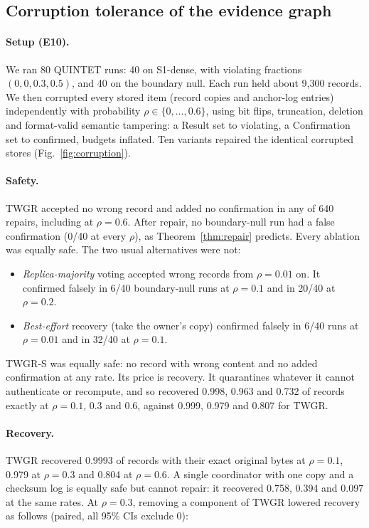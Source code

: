 \documentclass[11pt]{article}
\theoremstyle{definition}
\begin{document}
\subsection{Corruption tolerance of the evidence graph}\label{sec:corruption}
\paragraph{Setup (E10).} We ran 80 QUINTET runs: 40 on S1-dense, with violating fractions $(0,0,0.3,0.5)$, and 40 on the boundary null. Each run held about 9{,}300 records. We then corrupted every stored item (record copies and anchor-log entries) independently with probability $\rho\in\{0,\dots,0.6\}$, using bit flips, truncation, deletion and format-valid semantic tampering: a Result set to violating, a Confirmation set to confirmed, budgets inflated. Ten variants repaired the identical corrupted stores (Fig.~\ref{fig:corruption}).

\paragraph{Safety.} TWGR accepted no wrong record and added no confirmation in any of 640 repairs, including at $\rho=0.6$. After repair, no boundary-null run had a false confirmation (0/40 at every $\rho$), as Theorem~\ref{thm:repair} predicts. Every ablation was equally safe. The two usual alternatives were not:
\begin{itemize}
\item \emph{Replica-majority} voting accepted wrong records from $\rho=0.01$ on. It confirmed falsely in 6/40 boundary-null runs at $\rho=0.1$ and in 20/40 at $\rho=0.2$.
\item \emph{Best-effort} recovery (take the owner's copy) confirmed falsely in 6/40 runs at $\rho=0.01$ and in 32/40 at $\rho=0.1$.
\end{itemize}
TWGR-S was equally safe: no record with wrong content and no added confirmation at any rate. Its price is recovery. It quarantines whatever it cannot authenticate or recompute, and so recovered 0.998, 0.963 and 0.732 of records exactly at $\rho=0.1$, 0.3 and 0.6, against 0.999, 0.979 and 0.807 for TWGR.

\paragraph{Recovery.} TWGR recovered 0.9993 of records with their exact original bytes at $\rho=0.1$, 0.979 at $\rho=0.3$ and 0.804 at $\rho=0.6$. A single coordinator with one copy and a checksum log is equally safe but cannot repair: it recovered 0.758, 0.394 and 0.097 at the same rates. At $\rho=0.3$, removing a component of TWGR lowered recovery as follows (paired, all 95\% CIs exclude 0):
\end{document}
